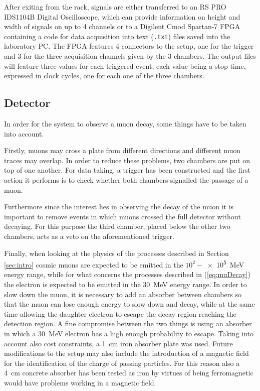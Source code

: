 \documentclass[../main.tex]{subfiles}
\begin{document}
After exiting from the rack, signals are either transferred to an RS PRO IDS1104B Digital Oscilloscope, which can provide information on height and width of signals on up to 4 channels or to a Digilent Cmod Spartan-7 FPGA containing a code for data acquisition into text (\texttt{.txt}) files saved into the laboratory PC. The FPGA features 4 connectors to the setup, one for the trigger and 3 for the three acquisition channels given by the 3 chambers. The output files will feature three values for each triggered event, each value being a stop time, expressed in clock cycles, one for each one of the three chambers. 

\subsection{Detector}
\label{sub:detector}
In order for the system to observe a muon decay, some things have to be taken into account.

Firstly, muons may cross a plate from different directions and different muon traces may overlap. In order to reduce these problems, two chambers are put on top of one another. For data taking, a trigger has been constructed and the first action it performs is to check whether both chambers signalled the passage of a muon.

Furthermore since the interest lies in observing the decay of the muon it is important to remove events in which muons crossed the full detector without decaying. For this purpose the third chamber, placed below the other two chambers, acts as a veto on the aforementioned trigger.

Finally, when looking at the physics of the processes described in Section  \ref{sec:intro} cosmic muons are expected to be emitted in the $10^2-$\SI{e5}{\MeV} energy range, while for what concerns the processes described in (\ref{eq:muDecay}) the electron is expected to be emitted in the \SI{30}{MeV} energy range. In order to slow down the muon, it is necessary to add an absorber between chambers so that the muon can lose enough energy to slow down and decay, while at the same time allowing the daughter electron to escape the decay region reaching the detection region. A fine compromise between the two things is using an absorber in which a \SI{30}{\MeV} electron has a high enough probability to escape. Taking into account also cost constraints, a \SI{1}{cm} iron absorber plate was used. Future modifications to the setup may also include the introduction of a magnetic field for the identification of the charge of passing particles. For this reason also a \SI{4}{\centi \meter} concrete absorber has been tested as iron by virtues of being ferromagnetic would have problems working in a magnetic field.\\
\end{document}
